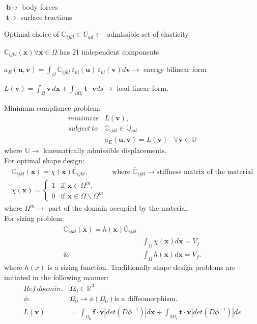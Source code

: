 \documentclass[10pt]{article}
\begin{document}
\begin{center}
$\textbf{b} \rightarrow$ body forces\\
$\textbf{t} \rightarrow$ surface tractions
\end{center}

Optimal choice of $\mathbb{C}_{ijkl} \in U_{ad} \leftarrow $ admissible set of elasticity \par $\mathbb{C}_{ijkl}(\textbf{x}) \forall \textbf{x} \in \Omega $ has 21 independent components \par $a_E(\textbf{u}, \textbf{v}) = \int_\Omega \mathbb{C}_{ijkl}\,\varepsilon_{kl}(\textbf{u})\,\varepsilon_{kl}(\textbf{v})d\textbf{v} \rightarrow $ energy bilinear form \par
$L(\textbf{v}) = \int_\Omega \textbf{v}\, d\textbf{x}+\int_{\partial\Omega_t} \textbf{t}\cdot\textbf{v}ds \rightarrow $ load linear form.\par
\hfill \break
Minimum compliance problem:
\begin{eqnarray}
minimize & L(\textbf{v}),\\
subject\, to & \mathbb{C}_{ijkl} \in \mathbb{U}_{ad}\\
		  & a_E(\textbf{u}, \textbf{v}) = L(\textbf{v}) &\forall \textbf{v} \in \mathbb{U} 
\end{eqnarray}
where $\mathbb{U}\rightarrow $ kinematically admissible displacements.\\
For optimal shape design:
\begin{eqnarray}
\mathbb{C}_{ijkl}(\textbf{x}) = \chi(\textbf{x})\overline{\mathbb{C}}_{ijkl}, & \textrm{where  } \overline{\mathbb{C}}_{ijkl}\rightarrow\textrm{stiffness matrix of the material}\\
\chi(\textbf{x}) =
    \begin{cases}
        1 & \text{if $\textbf{x}\in \Omega^m$,}\\
        0 & \text{if $\textbf{x}\in \Omega\backslash\Omega^m$}
    \end{cases}
\end{eqnarray}
where $\Omega^m \rightarrow$ part of the domain occupied by the material.\\
For sizing problem:
\begin{eqnarray}
\mathbb{C}_{ijkl}(\textbf{x}) = h(\textbf{x})\overline{\mathbb{C}}_{ijkl}\\
& \int_\Omega \chi(\textbf{x})d\textbf{x}=V_f\\
\& & \int_\Omega h(\textbf{x})d\textbf{x}=V_f.
\end{eqnarray}
where $h(x)$ is a sizing function. \hfill
\break
Traditionally shape design problems are initiated in the following manner:
\begin{align}
Ref\, doamin: & \Omega_0\in \mathbb{R}^3\\
\underline{\phi}:  & \Omega_0 \rightarrow \phi(\Omega_0) \text{is a diffeomorphism.}\\
L(\textbf{v})&=\int_{\Omega_0} \textbf{f}\cdot\textbf{v} |det(D\underline{\phi}^{-1})|d\textbf{x}+\int_{\partial\Omega_t} \textbf{t}\cdot\textbf{v}|det(D\underline{\phi}^{-1})|ds
\end{align}
\end{document}
